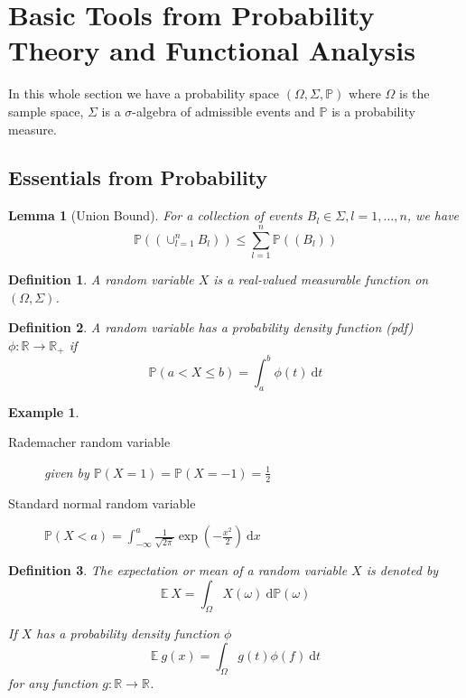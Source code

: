 \documentclass[10pt,a4paper]{article}
\theoremstyle{thmstyle}
\newtheorem{definition}{Definition}
\newtheorem{lemma}{Lemma}
\newtheorem{example}{Example}
\newcommand{\diff}{~\mathrm{d}}
\newcommand{\E}{\mathbb{E}~}
\renewcommand{\Pr}[1]{\mathbb{P}\left( #1 \right)}
\begin{document}
\section{Basic Tools from Probability Theory and Functional Analysis}

In this whole section we have a probability space $(\Omega, \Sigma, \mathbb{P})$ where $\Omega$ is the sample space, $\Sigma$ is a $\sigma$-algebra of admissible events and $\mathbb{P}$ is a probability measure.

\subsection{Essentials from Probability}

\begin{lemma}[Union Bound]
  For a collection of events $B_{l} \in \Sigma, l = 1, \dots, n$, we have
  \begin{equation*}
    \Pr{\left( \cup_{l = 1}^{n} B_{l} \right)} \le \sum_{l = 1}^{n} \Pr{(B_{l})}
  \end{equation*}
\end{lemma}

\begin{definition}
  A \emph{random variable} $X$ is a real-valued measurable function on $(\Omega, \Sigma)$.
\end{definition}

\begin{definition}
  A random variable has a \emph{probability density function} (pdf) $\phi : \mathbb{R} \rightarrow \mathbb{R}_{+}$ if
  \begin{equation*}
    \mathbb{P}(a < X \le b) = \int_{a}^{b} \phi(t) \diff t
  \end{equation*}
\end{definition}

\begin{example}
  \begin{description}
  \item[Rademacher random variable] given by $\Pr{X = 1} = \Pr{X = -1} = \frac{1}{2}$
  \item[Standard normal random variable] $\Pr{X < a} = \int_{-\infty}^{a} \frac{1}{\sqrt{2\pi}} \exp\left( -\frac{x^{2}}{2} \right) \diff x$
  \end{description}
\end{example}

\begin{definition}
  The \emph{expectation} or \emph{mean} of a random variable $X$ is denoted by
  \begin{equation*}
    \E X = \int_{\Omega} X(\omega) \diff \mathbb{P}(\omega)
  \end{equation*}

  If $X$ has a probability density function $\phi$
  \begin{equation*}
    \E g(x) = \int_{\Omega} g(t) \phi(f) \diff t
  \end{equation*}
  for any function $g : \mathbb{R} \rightarrow \mathbb{R}$.
\end{definition}
\end{document}
